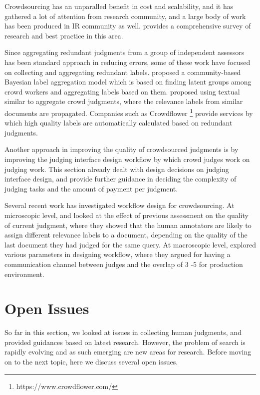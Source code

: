 Crowdsourcing has an unparalled benefit in cost and scalability, and it has gathered a lot of attention from research community, and a large body of work has been produced in IR community as well. \cite{Alonso2012} provides a comprehensive survey of research and best practice in this area. 

Since aggregating redundant judgments from a group of independent assessors has been standard approach in reducing errors, some of these work have focused on collecting and aggregating redundant labels. \cite{Venanzi:2014} proposed a community-based Bayesian label aggregation model which is based on finding latent groups among crowd workers and aggregating labels based on them. \cite{Davtyan2015} proposed using textual similar to aggregate crowd judgments, where the relevance labels from similar documents are propagated. Companies such as Crowdflower \footnote{https://www.crowdflower.com/} provide services by which high quality labels are automatically calculated based on redundant judgments.

Another approach in improving the quality of crowdsourced judgments is by improving the judging interface design workflow by which crowd judges work on judging work. This section already dealt with design decisions on judging interface design, and \cite{Kazai2012} provide further guidance in deciding the complexity of judging tasks and the amount of payment per judgment.

Several recent work has investigated workflow design for crowdsourcing. At microscopic level, \cite{Shokouhi:2015} and \cite{Scholer:2013} looked at the effect of previous assessment on the quality of current judgment, where they showed that the human annotators are likely to assign different relevance labels to a document, depending on the quality of the last document they had judged for the same query. At macroscopic level, \cite{Megorskaya2015} explored various parameters in designing workflow, where they argued for having a communication channel between judges and the overlap of 3 -5 for production environment.

\section{Open Issues}

So far in this section, we looked at issues in collecting human judgments, and provided guidances based on latest research. However, the problem of search is rapidly evolving and as such emerging are new areas for research. Before moving on to the next topic, here we discuss several open issues.

